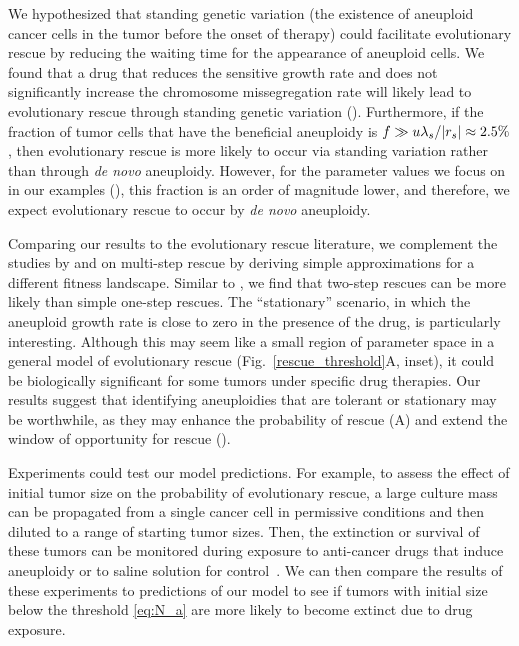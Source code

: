 \documentclass[12pt]{extarticle}
\renewcommand{\Delta}{r}
\begin{document}
We hypothesized that standing genetic variation (the existence of aneuploid cancer cells in the tumor before the onset of therapy) could facilitate evolutionary rescue by reducing the waiting time for the appearance of aneuploid cells. We found that a drug that reduces the sensitive growth rate and does not significantly increase the chromosome missegregation rate will likely lead to evolutionary rescue through standing genetic variation ().
Furthermore, if the fraction of tumor cells that have the beneficial aneuploidy is $f \gg u \lambda_s / \abs{\Delta_s} \approx2.5\%$, then evolutionary rescue is more likely to occur via standing variation rather than through \textit{de novo} aneuploidy. 
However, for the parameter values we focus on in our examples (), this fraction is an order of magnitude lower, and therefore, we expect evolutionary rescue to occur by \textit{de novo} aneuploidy.

Comparing our results to the evolutionary rescue literature, we complement the studies by \citet{iwasa2003evolutionary} and \citet{osmond_genetic_2020} on multi-step rescue by deriving simple approximations for a different fitness landscape. 
Similar to \citet{osmond_genetic_2020}, we find that two-step rescues can be more likely than simple one-step rescues. 
The ``stationary'' scenario, in which the aneuploid growth rate is close to zero in the presence of the drug, is particularly interesting.
Although this may seem like a small region of parameter space in a general model of evolutionary rescue (Fig.~\ref{rescue_threshold}A, inset), it could be biologically significant for some tumors under specific drug therapies.
Our results suggest that identifying aneuploidies that are tolerant or stationary may be worthwhile, as they may enhance the probability of rescue (A) and extend the window of opportunity for rescue ().

Experiments could test our model predictions. For example, to assess the effect of initial tumor size on the probability of evolutionary rescue, a large culture mass can be propagated from a single cancer cell in permissive conditions and then diluted to a range of starting tumor sizes. Then, the extinction or survival of these tumors can be monitored during exposure to anti-cancer drugs that induce aneuploidy or to saline solution for control~\citep{ippolito2021gene}. 
We can then compare the results of these experiments to predictions of our model to see if tumors with initial size below the threshold \cref{eq:N_a} are more likely to become extinct due to drug exposure.
\end{document}

